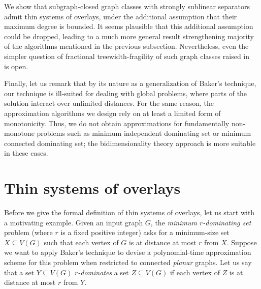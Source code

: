 \documentclass[a4paper,11pt]{article}
\begin{document}
We show that subgraph-closed graph classes with strongly sublinear separators admit thin systems of overlays,
under the additional assumption that their maximum degree is bounded.  It seems plausible that this additional
assumption could be dropped, leading to a much more general result strengthening majority of the algorithms
mentioned in the previous subsection.  Nevertheless, even the simpler question of fractional treewidth-fragility
of such graph classes raised in~\cite{twd} is open.

Finally, let us remark that by its nature as a generalization of Baker's technique,
our technique is ill-suited for dealing with global problems, where parts of the solution interact over unlimited distances.
For the same reason, the approximation algorithms we design rely on at least a limited form
of monotonicity.  Thus, we do not obtain approximations for fundamentally non-monotone problems such as
minimum independent dominating set or minimum connected dominating set; the bidimensionality theory approach
is more suitable in these cases.

\section{Thin systems of overlays}\label{sec-thinover}

Before we give the formal definition of thin systems of overlays, let us start with a motivating example.
Given an input graph $G$, the \emph{minimum $r$-dominating set} problem (where $r$ is a fixed positive integer)
asks for a minimum-size set $X\subseteq V(G)$ such that each vertex of $G$ is at distance at most $r$ from $X$.
Suppose we want to apply Baker's technique to devise a polynomial-time approximation scheme for this problem
when restricted to connected \emph{planar} graphs.
Let us say that a set $Y\subseteq V(G)$ \emph{$r$-dominates} a set $Z\subseteq V(G)$ if each vertex of $Z$ is at distance
at most $r$ from $Y$.
\end{document}
